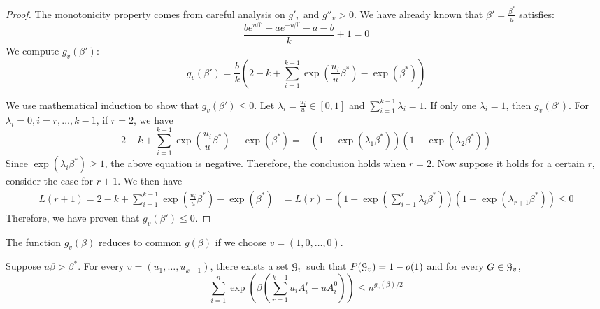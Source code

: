 \documentclass{article}
\begin{document}
\begin{proof}
	The monotonicity property comes from careful analysis on $g'_v$ and $g''_v>0$.
	We have already known that $\beta' = \frac{\beta^*}{u}$ satisfies:
	$$
	\frac{b e^{u\beta'} + a e^{-u\beta'}-a-b}{k}+1=0
	$$
	We compute $g_v(\beta')$:
	$$
	g_v(\beta') = \frac{b}{k}(2-k + \sum_{i=1}^{k-1}\exp(\frac{u_i}{u} \beta^*) - \exp(\beta^*))
	$$

	We use mathematical induction to show that $g_v(\beta') \leq 0$.
	Let $\lambda_i = \frac{u_i}{u} \in [0,1]$ and $\sum_{i=1}^{k-1} \lambda_i = 1$.
	If only one $\lambda_i = 1$, then $g_v(\beta')$.
	For $\lambda_i = 0, i=r,\dots, k-1$, if $r=2$, we have
	$$
	2-k + \sum_{i=1}^{k-1}\exp(\frac{u_i}{u} \beta^*) - \exp(\beta^*)
	= -(1-\exp(\lambda_1 \beta^*))(1-\exp(\lambda_2 \beta^*))
	$$
	Since $\exp(\lambda_i \beta^*) \geq 1$, the above equation is negative.
	Therefore, the conclusion holds when $r=2$.
	Now suppose it holds for a certain $r$, consider the case for $r+1$.
	We then have
	\begin{align*}
	L(r+1) = 2-k + \sum_{i=1}^{k-1}\exp(\frac{u_i}{u} \beta^*) - \exp(\beta^*)
	& = L(r)- (1-\exp(\sum_{i=1}^r \lambda_i \beta^*)) (1-\exp(\lambda_{r+1}\beta^*)) \leq 0
	\end{align*}
	Therefore, we have proven that $g_v(\beta') \leq 0$.
\end{proof}
\begin{remark}
	The function $g_v(\beta)$ reduces to common $g(\beta)$ if we choose $v=(1,0,\dots, 0)$.
\end{remark}
\begin{lemma}
	Suppose $u\beta > \beta^*$. For every $v=(u_1, \dots, u_{k-1})$,
	there exists a set $\mathcal{G}_v$ such that $P(\mathcal{G}_v) = 1-o(1)$ and for every $G\in \mathcal{G}_v$,
	\begin{equation}
	\sum_{i=1}^n \exp(\beta(\sum_{r=1}^{k-1}u_i A_i^r - u A_i^0)) \leq n^{g_v(\beta)/2}
	\end{equation}
\end{lemma}
\end{document}
